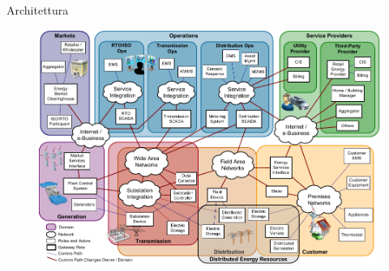 \begin{frame}[fragile]{Architettura}
	\vspace{-10pt}
	\begin{figure}[h] 
		\includegraphics[scale=0.45]{imgs/arch.png}
	\end{figure}
\end{frame}




